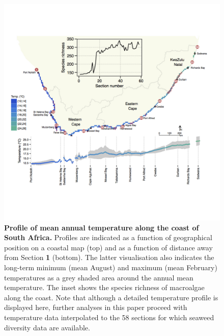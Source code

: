 \documentclass[utf8]{frontiersSCNS} %
\begin{document}
\begin{figure}[!ht]
\centering
\includegraphics[width=1.0\textwidth]{../figures/Fig1.jpg}
\caption{{\bf Profile of mean annual temperature along the coast of South Africa.} Profiles are indicated as a function of geographical position on a coastal map (top) and as a function of distance away from Section \textbf{1} (bottom). The latter visualisation also indicates the long-term minimum (mean August) and maximum (mean February) temperatures as a grey shaded area around the annual mean temperature. The inset shows the species richness of macroalgae along the coast. Note that although a detailed temperature profile is displayed here, further analyses in this paper proceed with temperature data interpolated to the 58 sections for which seaweed diversity data are available.}
\label{fig1}
\end{figure}
\end{document}
